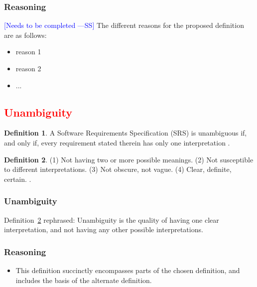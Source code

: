 \documentclass[letterpaper, cleveref]{lipics-v2019}
\newcommand{\authornote}[3]{\textcolor{#1}{[#3 ---#2]}}
\newcommand{\authornote}[3]{}
\newcommand{\wss}[1]{\authornote{blue}{SS}{#1}} %
\newcommand{\notdone}[1]{\textcolor{red}{#1}}
\theoremstyle{definition}
\newtheorem{defn}{Definition}
\begin{document}
\subsubsection*{Reasoning}

\wss{Needs to be completed}  The different reasons for the proposed definition
are as follows:

\begin{itemize}
  \item reason 1
  \item reason 2
  \item ...
\end{itemize}


\subsection{\notdone{Unambiguity}} %

\begin{defn}
 A Software Requirements Specification (SRS) is unambiguous if, and only if,
 every requirement stated therein has only one interpretation \citep{IEEE1998}.
\end{defn}

\begin{defn}
	\label{UnambiguitySelected} (1) Not having two or more possible meanings. (2) Not susceptible to different interpretations. (3) Not obscure, not vague. (4) Clear, definite, certain. \citep{FDA2014}.
\end{defn}

\begin{mybox}
\subsubsection*{Unambiguity} 
Definition~\ref{UnambiguitySelected} rephrased: Unambiguity is the quality of having one clear interpretation, and not having any other possible interpretations.
\end{mybox}

\subsubsection*{Reasoning}

\begin{itemize}
  \item This definition succinctly encompasses parts of the chosen definition, and includes the basis of the alternate definition.
\end{itemize}
\end{document}
